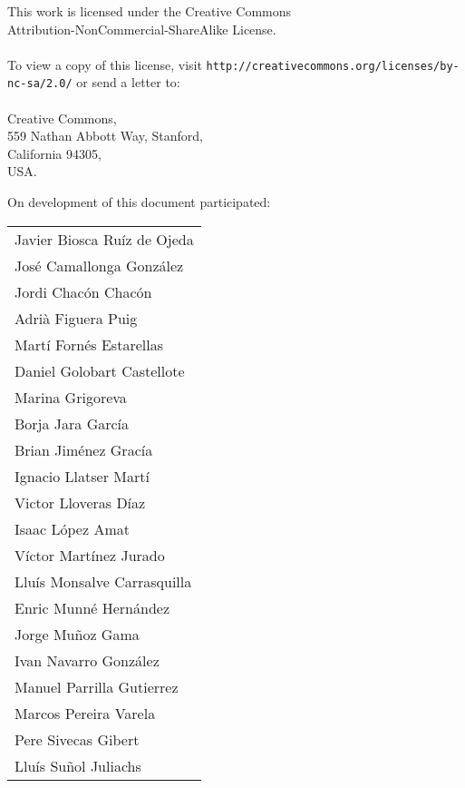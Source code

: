 \documentclass[11pt,svgnames]{scrbook}
\begin{document}
\vspace*{5cm}
\begin{flushleft}
This work is licensed under the Creative Commons\\
Attribution-NonCommercial-ShareAlike License.
\byncsa\\
\ \\
To view a copy of this license, visit
{\tt  http://creativecommons.org/licenses/by-nc-sa/2.0/} or
send a letter to:
\ \\ \ \\

Creative Commons, \\
559 Nathan Abbott Way, Stanford, \\
California 94305, \\
USA.
\end{flushleft}

\thispagestyle{empty}
\newpage

\vspace*{3cm}
On development of this document participated:
\bigskip

\begin{tabular}{l}
Javier Biosca Ruíz de Ojeda\\
José Camallonga González\\
Jordi Chacón Chacón\\
Adrià Figuera Puig\\
Martí Fornés Estarellas\\
Daniel Golobart Castellote\\
Marina Grigoreva\\
Borja Jara García\\
Brian Jiménez Gracía\\
Ignacio Llatser Martí\\
Victor Lloveras Díaz\\
Isaac López Amat\\
Víctor Martínez Jurado\\
Lluís Monsalve Carrasquilla\\
Enric Munné Hernández\\
Jorge Muñoz Gama\\
Ivan Navarro González\\
Manuel Parrilla Gutierrez\\
Marcos Pereira Varela\\
Pere Sivecas Gibert\\
Lluís Suñol Juliachs\\
\end{tabular}
\end{document}
